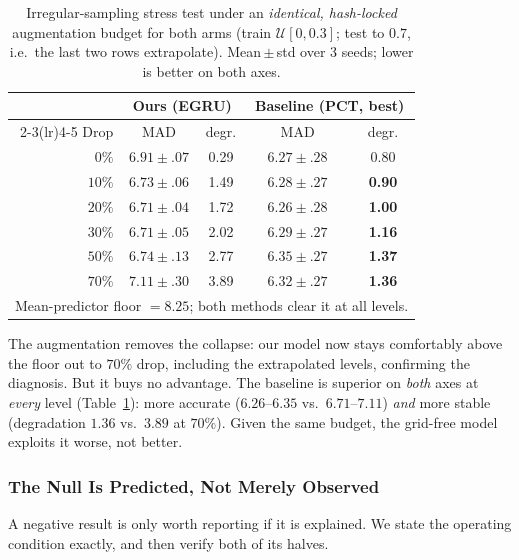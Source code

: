 \begin{table}[!t]
\centering
\caption{Irregular-sampling stress test under an \emph{identical, hash-locked} augmentation budget
for both arms (train $\mathcal{U}[0,0.3]$; test to $0.7$, i.e.\ the last two rows extrapolate).
Mean\,$\pm$\,std over 3 seeds; lower is better on both axes.}
\label{tab:resampling}
\small
\begin{tabular}{rcccc}
\toprule
& \multicolumn{2}{c}{Ours (EGRU)} & \multicolumn{2}{c}{Baseline (PCT, best)} \\
\cmidrule(lr){2-3}\cmidrule(lr){4-5}
Drop & MAD & degr. & MAD & degr. \\
\midrule
$0\%$  & $6.91{\pm}.07$ & 0.29 & $\mathbf{6.27{\pm}.28}$ & 0.80 \\
$10\%$ & $6.73{\pm}.06$ & 1.49 & $\mathbf{6.28{\pm}.27}$ & \textbf{0.90} \\
$20\%$ & $6.71{\pm}.04$ & 1.72 & $\mathbf{6.26{\pm}.28}$ & \textbf{1.00} \\
$30\%$ & $6.71{\pm}.05$ & 2.02 & $\mathbf{6.29{\pm}.27}$ & \textbf{1.16} \\
$50\%$ & $6.74{\pm}.13$ & 2.77 & $\mathbf{6.35{\pm}.27}$ & \textbf{1.37} \\
$70\%$ & $7.11{\pm}.30$ & 3.89 & $\mathbf{6.32{\pm}.27}$ & \textbf{1.36} \\
\midrule
\multicolumn{5}{l}{\footnotesize Mean-predictor floor $=8.25$; both methods clear it at all levels.} \\
\bottomrule
\end{tabular}
\end{table}

The augmentation removes the collapse: our model now stays comfortably above the floor out to
$70\%$ drop, including the extrapolated levels, confirming the diagnosis. But it buys no advantage.
The baseline is superior on \emph{both} axes at \emph{every} level (Table~\ref{tab:resampling}):
more accurate ($6.26$--$6.35$ vs.\ $6.71$--$7.11$) \emph{and} more stable (degradation $1.36$ vs.\
$3.89$ at $70\%$). Given the same budget, the grid-free model exploits it worse, not better.

\subsubsection{The Null Is Predicted, Not Merely Observed}
\label{sec:results:bandwidth}

A negative result is only worth reporting if it is explained. We state the operating condition
exactly, and then verify both of its halves.

